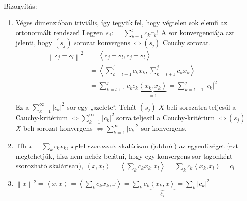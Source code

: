 \documentclass[12pt,a4paper]{scrartcl}
\providecommand{\tightlist}{%
  \setlength{\itemsep}{0pt}\setlength{\parskip}{0pt}}
\newenvironment{bizonyitas}{}{}
\begin{document}
\begin{bizonyitas}

Bizonyítás:

\begin{enumerate}
\def\labelenumi{\arabic{enumi}.}
\tightlist
\item
  Véges dimenzióban triviális, így tegyük fel, hogy végtelen sok elemű
  az ortonormált rendszer! Legyen
  \(s_{j}: = {\sum\limits_{k = 1}^{j}{c_{k}x_{k}}}\)! A sor
  konvergenciája azt jelenti, hogy \(\left( s_{j} \right)\) sorozat
  konvergens \(\left. \Leftrightarrow\left( s_{j} \right) \right.\)
  Cauchy sorozat. \[\begin{aligned}
    {\left\| {{s_j} - {s_l}} \right\|^2} &  = \left\langle {{s_j} - {s_l},{s_j} - {s_l}} \right\rangle  \\ 
     &  = \left\langle {\mathop \sum \limits_{k = l + 1}^j {c_k}{x_k},\mathop \sum \limits_{k = l + 1}^j {c_k}{x_k}} \right\rangle  \\ 
     &  = \mathop \sum \limits_{k = l + 1}^j {c_k}{{\bar c}_k}\underbrace {\left\langle {{x_k},{x_k}} \right\rangle }_{ = 1} = \mathop \sum \limits_{k = l + 1}^j {\left| {{c_k}} \right|^2} \\ 
  \end{aligned} \] Ez a
  \(\sum\limits_{k = 1}^{\infty}\left| c_{k} \right|^{2}\) sor egy
  „szelete``. Tehát \(\left( s_{j} \right)\) \(X\)-beli sorozatra
  teljesül a Cauchy-kritérium
  \(\left. \Leftrightarrow{\sum\limits_{k = 1}^{\infty}\left| c_{k} \right|^{2}} \right.\)
  sorra teljesül a Cauchy-kritérium
  \(\left. \Leftrightarrow\left( s_{j} \right) \right.\) \(X\)-beli
  sorozat konvergens
  \(\left. \Leftrightarrow{\sum\limits_{k = 1}^{\infty}\left| c_{k} \right|^{2}} \right.\)
  sor konvergens.
\item
  Tfh \(x = {\sum\limits_{k}{c_{k}x_{k}}}\), \(x_{l}\)-lel szorozzuk
  skalárisan (jobbról) az egyenlőséget (ezt megtehetjük, hisz nem nehéz
  belátni, hogy egy konvergens sor tagonként szorozható skalárisan),
  \(\left\langle {x,x_{l}} \right\rangle = \left\langle {\sum\limits_{k}{c_{k}x_{k},x_{l}}} \right\rangle = {\sum\limits_{k}{c_{k}\left\langle {x_{k},x_{l}} \right\rangle = c_{l}}}\)
\item
  \({\left\| x \right\|^2} = \left\langle {x,x} \right\rangle = \left\langle {\mathop \sum \limits_k {c_k}{x_k},x} \right\rangle = \mathop \sum \limits_k {c_k}\underbrace {\left\langle {{x_k},x} \right\rangle }_{{{\bar c}_k}} = \mathop \sum \limits_k {\left| {{c_k}} \right|^2}\)
\end{enumerate}

\end{bizonyitas}
\end{document}
